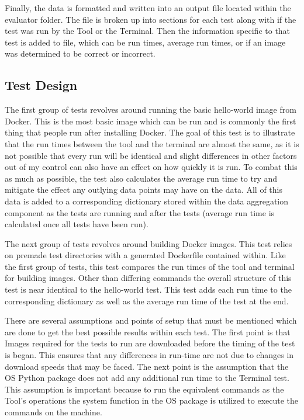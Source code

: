 Finally, the data is formatted and written into an output file located within the evaluator folder. The file is broken up into sections for each test along with if the test was run by the Tool or the Terminal. Then the information specific to that test is added to file, which can be run times, average run times, or if an image was determined to be correct or incorrect.

\subsection{Test Design}
\label{sec:test_design}

The first group of tests revolves around running the basic hello-world image from Docker. This is the most basic image which can be run and is commonly the first thing that people run after installing Docker. The goal of this test is to illustrate that the run times between the tool and the terminal are almost the same, as it is not possible that every run will be identical and slight differences in other factors out of my control can also have an effect on how quickly it is run. To combat this as much as possible, the test also calculates the average run time to try and mitigate the effect any outlying data points may have on the data. All of this data is added to a corresponding dictionary stored within the data aggregation component as the tests are running and after the tests (average run time is calculated once all tests have been run).

The next group of tests revolves around building Docker images. This test relies on premade test directories with a generated Dockerfile contained within. Like the first group of tests, this test compares the run times of the tool and terminal for building images. Other than differing commands the overall structure of this test is near identical to the hello-world test. This test adds each run time to the corresponding dictionary as well as the average run time of the test at the end.

There are several assumptions and points of setup that must be mentioned which are done to get the best possible results within each test. The first point is that Images required for the tests to run are downloaded before the timing of the test is began. This ensures that any differences in run-time are not due to changes in download speeds that may be faced. The next point is the assumption that the OS Python package does not add any additional run time to the Terminal test. This assumption is important because to run the equivalent commands as the Tool's operations the system function in the OS package is utilized to execute the commands on the machine.

